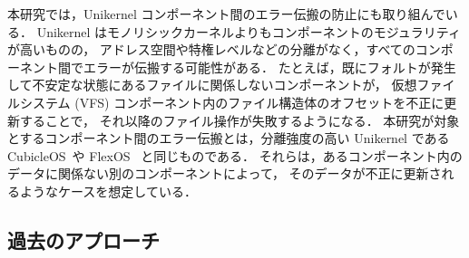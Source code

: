 本研究では，Unikernel コンポーネント間のエラー伝搬の防止にも取り組んでいる．
Unikernel はモノリシックカーネルよりもコンポーネントのモジュラリティが高いものの，
アドレス空間や特権レベルなどの分離がなく，すべてのコンポーネント間でエラーが伝搬する可能性がある．
たとえば，既にフォルトが発生して不安定な状態にあるファイルに関係しないコンポーネントが，
仮想ファイルシステム (VFS) コンポーネント内のファイル構造体のオフセットを不正に更新することで，
それ以降のファイル操作が失敗するようになる．
本研究が対象とするコンポーネント間のエラー伝搬とは，分離強度の高い Unikernel である
CubicleOS~\cite{SartakovEtAl-ASPLOS21}や FlexOS~\cite{LefeuvreEtAl-FlexOS} と同じものである．
それらは，あるコンポーネント内のデータに関係ない別のコンポーネントによって，
そのデータが不正に更新されるようなケースを想定している．









\subsection{過去のアプローチ}

